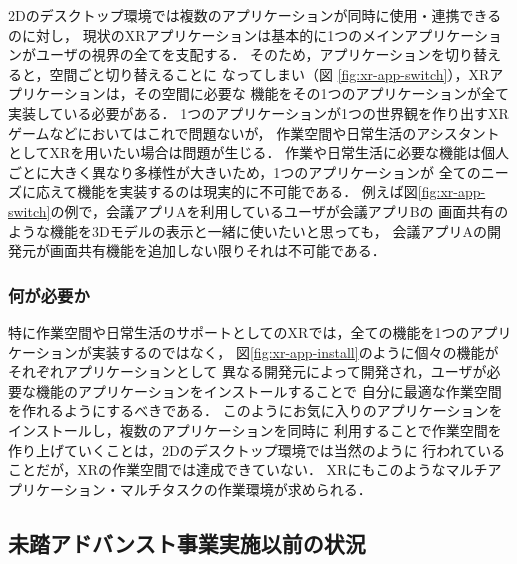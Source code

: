2Dのデスクトップ環境では複数のアプリケーションが同時に使用・連携できるのに対し，
現状のXRアプリケーションは基本的に1つのメインアプリケーションがユーザの視界の全てを支配する．
そのため，アプリケーションを切り替えると，空間ごと切り替えることに
なってしまい（図 \ref{fig:xr-app-switch}），XRアプリケーションは，その空間に必要な
機能をその1つのアプリケーションが全て実装している必要がある．
1つのアプリケーションが1つの世界観を作り出すXRゲームなどにおいてはこれで問題ないが，
作業空間や日常生活のアシスタントとしてXRを用いたい場合は問題が生じる．
作業や日常生活に必要な機能は個人ごとに大きく異なり多様性が大きいため，1つのアプリケーションが
全てのニーズに応えて機能を実装するのは現実的に不可能である．
例えば図\ref{fig:xr-app-switch}の例で，会議アプリAを利用しているユーザが会議アプリBの
画面共有のような機能を3Dモデルの表示と一緒に使いたいと思っても，
会議アプリAの開発元が画面共有機能を追加しない限りそれは不可能である．


\subsubsection{何が必要か}

特に作業空間や日常生活のサポートとしてのXRでは，全ての機能を1つのアプリケーションが実装するのではなく，
図\ref{fig:xr-app-install}のように個々の機能がそれぞれアプリケーションとして
異なる開発元によって開発され，ユーザが必要な機能のアプリケーションをインストールすることで
自分に最適な作業空間を作れるようにするべきである．
このようにお気に入りのアプリケーションをインストールし，複数のアプリケーションを同時に
利用することで作業空間を作り上げていくことは，2Dのデスクトップ環境では当然のように
行われていることだが，XRの作業空間では達成できていない．
XRにもこのようなマルチアプリケーション・マルチタスクの作業環境が求められる．

\subsection{未踏アドバンスト事業実施以前の状況}
\label{section:current-status}

